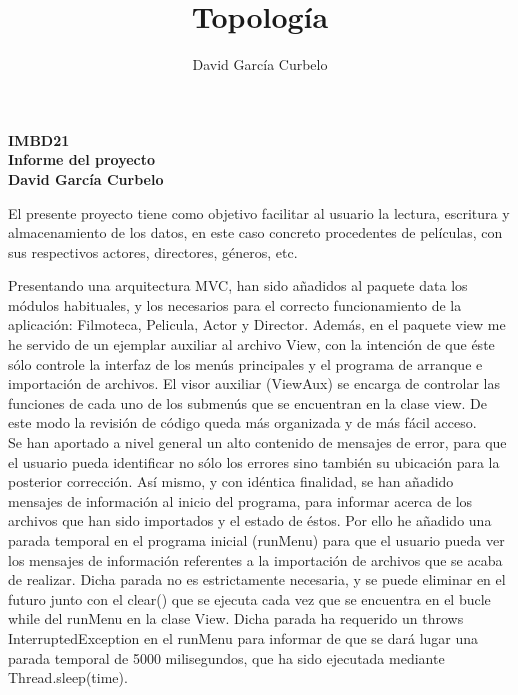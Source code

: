 \documentclass[fleqn]{article}
\author{David García Curbelo}
\title{Topología}
\begin{document}
    \doublespace

    \setcounter{page}{1}
    \pagestyle{plain}

    \begin{center}
        {\Large\bf{IMBD21}} \\
        {\large\bf{Informe del proyecto}} \\
        \bf{David García Curbelo}\\
        
    \end{center}

    El presente proyecto tiene como objetivo facilitar al usuario la lectura, escritura y almacenamiento de los datos,
    en este caso concreto procedentes de películas, con sus respectivos actores, directores, géneros, etc.

    Presentando una arquitectura MVC, han sido añadidos al paquete data los módulos habituales, y los necesarios para 
    el correcto funcionamiento de la aplicación: Filmoteca, Pelicula, Actor y Director. Además, en el paquete view me he servido 
    de un ejemplar auxiliar al archivo View, con la intención de que éste sólo controle la interfaz de los menús principales
    y el programa de arranque e importación de archivos. El visor auxiliar (ViewAux) se encarga de controlar las funciones de cada 
    uno de los submenús que se encuentran en la clase view. De este modo la revisión de código queda más organizada y de más fácil acceso.\\
    
    Se han aportado a nivel general un alto contenido de mensajes de error, para que el usuario pueda identificar no sólo los errores sino 
    también su ubicación para la posterior corrección. Así mismo, y con idéntica finalidad, se han añadido mensajes de información al inicio del programa,
    para informar acerca de los archivos que han sido importados y el estado de éstos. Por ello he añadido una parada temporal en el programa
    inicial (runMenu) para que el usuario pueda ver los mensajes de información referentes a la importación de archivos que se acaba de realizar.
    Dicha parada no es estrictamente necesaria, y se puede eliminar en el futuro junto con el clear() que se ejecuta cada vez que se encuentra 
    en el bucle while del runMenu en la clase View. Dicha parada ha requerido un throws InterruptedException en el runMenu para informar de que 
    se dará lugar una parada temporal de 5000 milisegundos, que ha sido ejecutada mediante Thread.sleep(time).
\end{document}
